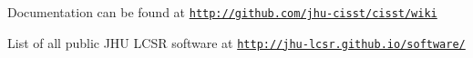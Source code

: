 Documentation can be found at \href{http://github.com/jhu-cisst/cisst/wiki}{\tt http\+://github.\+com/jhu-\/cisst/cisst/wiki}

List of all public J\+H\+U L\+C\+S\+R software at \href{http://jhu-lcsr.github.io/software/}{\tt http\+://jhu-\/lcsr.\+github.\+io/software/} 